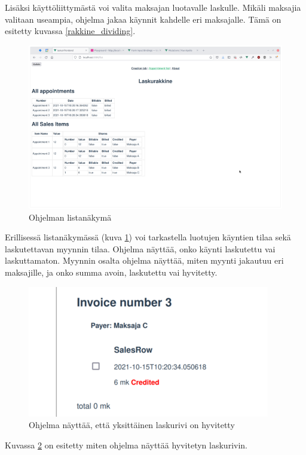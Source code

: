 Lisäksi käyttöliittymästä voi valita maksajan luotavalle laskulle.
Mikäli maksajia valitaan useampia, ohjelma jakaa käynnit kahdelle eri
maksajalle. Tämä on esitetty kuvassa \ref{rakkine_dividing}.

\begin{figure}
\centering
\includegraphics{illustration/screenshots/List-view.png}
\caption{\label{rakkine_list-view}Ohjelman listanäkymä}
\end{figure}

Erillisessä listanäkymässä (kuva \ref{rakkine_list-view}) voi
tarkastella luotujen käyntien tilaa sekä laskutettavan myynnin tilaa.
Ohjelma näyttää, onko käynti laskutettu vai laskuttamaton. Myynnin
osalta ohjelma näyttää, miten myynti jakautuu eri maksajille, ja onko
summa avoin, laskutettu vai hyvitetty.

\begin{figure}
\centering
\includegraphics{illustration/screenshots/credited.png}
\caption{\label{rakkine_credited}Ohjelma näyttää, että yksittäinen
laskurivi on hyvitetty}
\end{figure}

Kuvassa \ref{rakkine_credited} on esitetty miten ohjelma näyttää
hyvitetyn laskurivin.

